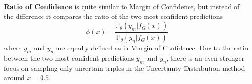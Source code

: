 \textbf{Ratio of Confidence}
is quite similar to Margin of Confidence, but instead of the difference it compares the ratio of the two most confident predictions
\begin{equation}
    \phi(x) = \frac{\mathds{P}_{\theta}(y_m | f_G(x))}{\mathds{P}_{\theta}(y_n | f_G(x))}
\end{equation}
where $y_m$ and $y_n$ are equally defined as in Margin of Confidence.
Due to the ratio between the two most confident predictions $y_m$ and $y_n$, there is an even stronger focus on sampling only uncertain triples in the Uncertainty Distribution method around $x = 0.5$.


